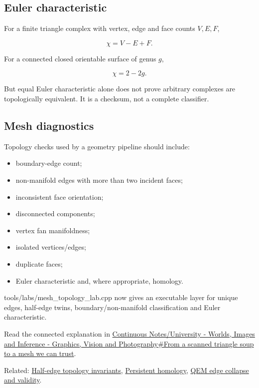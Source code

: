 \subsection{Euler characteristic}\label{euler-characteristic}

For a finite triangle complex with vertex, edge and face counts \(V,E,F\),

\[
\chi=V-E+F.
\]

For a connected closed orientable surface of genus \(g\),

\[
\chi=2-2g.
\]

But equal Euler characteristic alone does not prove arbitrary complexes are topologically equivalent. It is a checksum, not a complete classifier.

\subsection{Mesh diagnostics}\label{mesh-diagnostics}

Topology checks used by a geometry pipeline should include:

\begin{itemize}
\tightlist
\item
  boundary-edge count;
\item
  non-manifold edges with more than two incident faces;
\item
  inconsistent face orientation;
\item
  disconnected components;
\item
  vertex fan manifoldness;
\item
  isolated vertices/edges;
\item
  duplicate faces;
\item
  Euler characteristic and, where appropriate, homology.
\end{itemize}

tools/labs/mesh\_topology\_lab.cpp now gives an executable layer for unique edges, half-edge twins, boundary/non-manifold classification and Euler characteristic.

Read the connected explanation in \href{Continuous\%20Notes/University\%20-\%20Worlds,\%20Images\%20and\%20Inference\%20-\%20Graphics,\%20Vision\%20and\%20Photography\#From\%20a\%20scanned\%20triangle\%20soup\%20to\%20a\%20mesh\%20we\%20can\%20trust}{Continuous Notes/University - Worlds, Images and Inference - Graphics, Vision and Photography\#From a scanned triangle soup to a mesh we can trust}.

Related: \hyperref[appendix-faac749c9cdd]{Half-edge topology invariants}, \hyperref[appendix-e4d8ed8d6787]{Persistent homology}, \hyperref[appendix-89db9fe1bc8a]{QEM edge collapse and validity}.
